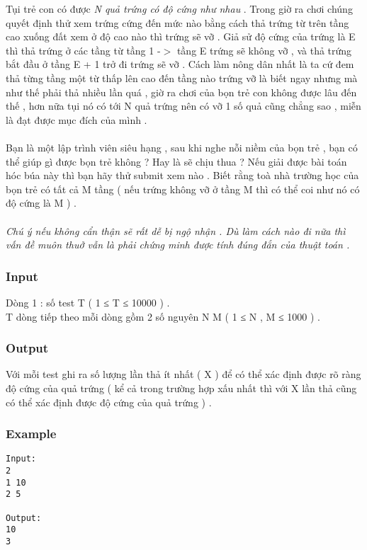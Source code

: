 



   Tụi trẻ con có được   \textit{    N quả trứng có độ cứng như nhau   }   . Trong giờ ra chơi chúng quyết định thử xem trứng cứng đến mức nào bằng cách thả trứng từ trên tầng cao xuống đất xem ở độ cao nào thì trứng sẽ vỡ . Giả sử độ cứng của trứng là E thì thả trứng ở các tầng từ tầng 1 -$>$ tầng E trứng sẽ không vỡ , và thả trứng bắt đầu ở tầng E + 1 trở đi trứng sẽ vỡ . Cách làm nông dân nhất là ta cứ đem thả từng tầng một từ thấp lên cao đến tầng nào trứng vỡ là biết ngay nhưng mà như thế phải thả nhiều lần quá , giờ ra chơi của bọn trẻ con không được lâu đến thế , hơn nữa tụi nó có tới N quả trứng nên có vỡ 1 số quả cũng chẳng sao , miễn là đạt được mục đích của mình .   
\\
\\   Bạn là một lập trình viên siêu hạng , sau khi nghe nỗi niềm của bọn trẻ , bạn có thể giúp gì được bọn trẻ không ? Hay là sẽ chịu thua ? Nếu giải được bài toán hóc búa này thì bạn hãy thử submit xem nào . Biết rằng toà nhà trường học của bọn trẻ có tất cả M tầng  ( nếu trứng không vỡ ở tầng M thì có thể coi như nó có độ cứng là M ) .   
\\
\\\textit{         Chú ý nếu không cẩn thận sẽ rất dễ bị ngộ nhận . Dù làm cách nào đi nữa thì vấn đề muôn thuở vẫn là phải chứng minh được tính đúng đắn của thuật toán .       }

\subsubsection{   Input  }

   Dòng 1 : số test T ( 1 ≤ T ≤ 10000 ) .   
\\   T dòng tiếp theo mỗi dòng gồm 2 số nguyên N M ( 1 ≤ N , M ≤ 1000 ) .  

\subsubsection{   Output  }

   Với mỗi test ghi ra số lượng lần thả ít nhất ( X ) để có thể xác định được rõ ràng độ cứng của quả trứng ( kể cả trong trường hợp xấu nhất thì với X lần thả cũng có thể xác định được độ cứng của quả trứng ) .  

\subsubsection{   Example  }
\begin{verbatim}
Input:
2
1 10
2 5

Output:
10
3

\end{verbatim}